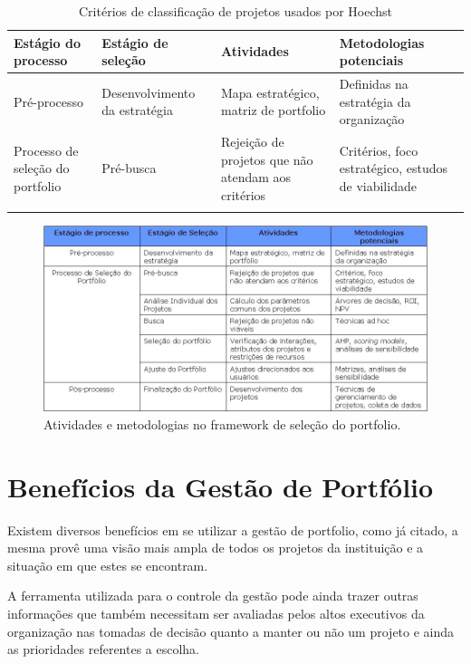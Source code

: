 \documentclass[12pt,a4paper,ruledheader,tocpage=prefix,floatnumber=continuous,pagestart=folhaderosto,font=times]{abnt}
\begin{document}
\begin{table}[H]
\begin{center}
 \begin{tabular}{| >{\arraybackslash\small}m{1.4in} | >{\arraybackslash\small}m{1.3in} | >{\arraybackslash\small}m{1.1in} | >{\arraybackslash\small}m{2in} |}
  \hline
  \rowcolor{purple} Estágio do processo & Estágio de seleção & Atividades & Metodologias potenciais \\
  \hline
   Pré-processo & Desenvolvimento da estratégia & Mapa estratégico, matriz de portfolio & Definidas na estratégia da organização \\
  \hline
  Processo de seleção do portfolio & Pré-busca & Rejeição de projetos que não atendam aos critérios & Critérios, foco estratégico, estudos de viabilidade \\
  \hline
	  &  & & \\
  \hline
 \end{tabular}
\caption{Critérios de classificação de projetos usados por Hoechst\cite{cooper}}
\end{center}
\end{table}

\begin{figure}[H]
\centering
\includegraphics[width=.9\textwidth]{tabela_archer.jpg}
\caption{Atividades e metodologias no framework de seleção do portfolio\cite{archer}.}
\end{figure}

\section{Benefícios da Gestão de Portfólio}
Existem diversos benefícios em se utilizar a gestão de portfolio, como já citado, a mesma provê uma visão mais ampla de todos os projetos da instituição 
e a situação em que estes se encontram.

A ferramenta utilizada para o controle da gestão pode ainda trazer outras informações que também necessitam ser avaliadas pelos altos executivos da 
organização nas tomadas de decisão quanto a manter ou não um projeto e ainda as prioridades referentes a escolha.
\end{document}
